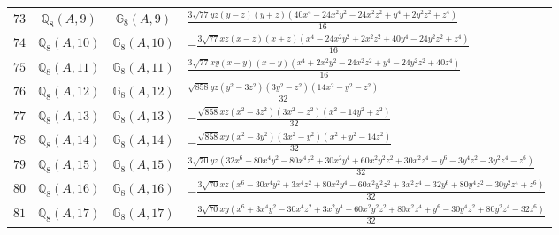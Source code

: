 \documentclass[fleqn,8pt,landscape]{jsarticle}
\begin{document}
\begin{table}[ht!]
\begin{center}
\begin{tabular}{cccl}
$ 73 $ & $ \mathbb{Q}_{8}(A,9) $ & $ \mathbb{G}_{8}(A,9) $ & $ \frac{3 \sqrt{77} y z \left(y - z\right) \left(y + z\right) \left(40 x^{4} - 24 x^{2} y^{2} - 24 x^{2} z^{2} + y^{4} + 2 y^{2} z^{2} + z^{4}\right)}{16} $ \\
$ 74 $ & $ \mathbb{Q}_{8}(A,10) $ & $ \mathbb{G}_{8}(A,10) $ & $ - \frac{3 \sqrt{77} x z \left(x - z\right) \left(x + z\right) \left(x^{4} - 24 x^{2} y^{2} + 2 x^{2} z^{2} + 40 y^{4} - 24 y^{2} z^{2} + z^{4}\right)}{16} $ \\
$ 75 $ & $ \mathbb{Q}_{8}(A,11) $ & $ \mathbb{G}_{8}(A,11) $ & $ \frac{3 \sqrt{77} x y \left(x - y\right) \left(x + y\right) \left(x^{4} + 2 x^{2} y^{2} - 24 x^{2} z^{2} + y^{4} - 24 y^{2} z^{2} + 40 z^{4}\right)}{16} $ \\
$ 76 $ & $ \mathbb{Q}_{8}(A,12) $ & $ \mathbb{G}_{8}(A,12) $ & $ \frac{\sqrt{858} y z \left(y^{2} - 3 z^{2}\right) \left(3 y^{2} - z^{2}\right) \left(14 x^{2} - y^{2} - z^{2}\right)}{32} $ \\
$ 77 $ & $ \mathbb{Q}_{8}(A,13) $ & $ \mathbb{G}_{8}(A,13) $ & $ - \frac{\sqrt{858} x z \left(x^{2} - 3 z^{2}\right) \left(3 x^{2} - z^{2}\right) \left(x^{2} - 14 y^{2} + z^{2}\right)}{32} $ \\
$ 78 $ & $ \mathbb{Q}_{8}(A,14) $ & $ \mathbb{G}_{8}(A,14) $ & $ - \frac{\sqrt{858} x y \left(x^{2} - 3 y^{2}\right) \left(3 x^{2} - y^{2}\right) \left(x^{2} + y^{2} - 14 z^{2}\right)}{32} $ \\
$ 79 $ & $ \mathbb{Q}_{8}(A,15) $ & $ \mathbb{G}_{8}(A,15) $ & $ \frac{3 \sqrt{70} y z \left(32 x^{6} - 80 x^{4} y^{2} - 80 x^{4} z^{2} + 30 x^{2} y^{4} + 60 x^{2} y^{2} z^{2} + 30 x^{2} z^{4} - y^{6} - 3 y^{4} z^{2} - 3 y^{2} z^{4} - z^{6}\right)}{32} $ \\
$ 80 $ & $ \mathbb{Q}_{8}(A,16) $ & $ \mathbb{G}_{8}(A,16) $ & $ - \frac{3 \sqrt{70} x z \left(x^{6} - 30 x^{4} y^{2} + 3 x^{4} z^{2} + 80 x^{2} y^{4} - 60 x^{2} y^{2} z^{2} + 3 x^{2} z^{4} - 32 y^{6} + 80 y^{4} z^{2} - 30 y^{2} z^{4} + z^{6}\right)}{32} $ \\
$ 81 $ & $ \mathbb{Q}_{8}(A,17) $ & $ \mathbb{G}_{8}(A,17) $ & $ - \frac{3 \sqrt{70} x y \left(x^{6} + 3 x^{4} y^{2} - 30 x^{4} z^{2} + 3 x^{2} y^{4} - 60 x^{2} y^{2} z^{2} + 80 x^{2} z^{4} + y^{6} - 30 y^{4} z^{2} + 80 y^{2} z^{4} - 32 z^{6}\right)}{32} $ \\
 \hline \hline
\end{tabular}
\end{center}
\end{table}
\end{document}
